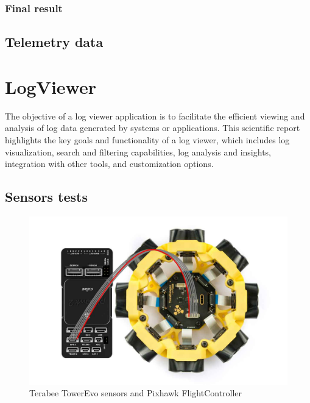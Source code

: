 \subsubsection{Final result}

\subsection{Telemetry data}


\section{LogViewer}
The objective of a log viewer application is to facilitate the efficient viewing and analysis of log data generated by systems or applications. This scientific report highlights the key goals and functionality of a log viewer, which includes log visualization, search and filtering capabilities, log analysis and insights, integration with other tools, and customization options.
\subsection{Sensors tests}

\begin{figure}[H]
    \centering
    \includegraphics[width=0.65\linewidth]{./projects/logviewer/tower_evo_pixhawk.jpg}
    \caption{Terabee TowerEvo sensors and Pixhawk FlightController}
\end{figure}


